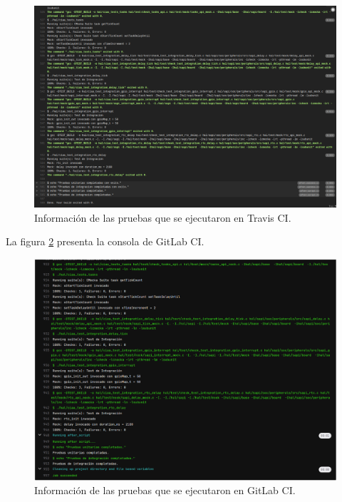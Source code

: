 \begin{figure}[ht]
	\centering
	\includegraphics[scale=.35]{./Figures/travis.png}
	\caption{Información de las pruebas que se ejecutaron en Travis CI.}
	\label{fig:travis}
\end{figure}


La figura \ref{fig:gitLab} presenta la consola de GitLab CI.  

\begin{figure}[ht]
	\centering
	\includegraphics[scale=.40]{./Figures/gitLab.png}
	\caption{Información de las pruebas que se ejecutaron en GitLab CI.}
	\label{fig:gitLab}
\end{figure}

\hfill \break
\hfill \break
\hfill \break
\hfill \break
\hfill \break




